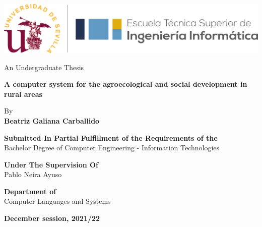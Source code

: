 \begin{center}

\vspace*{1cm}

\includegraphics[width=\textwidth]{fig/etsii_us.png}

\vspace*{3cm}
\begin{large}
An Undergraduate Thesis
\end{large}

\vspace*{0.1in}
\textbf{\huge A computer system for the agroecological and social development in rural areas} %

\vspace*{.2in}

{\large By}\\
\textbf{\Large Beatriz Galiana Carballido} %

\vspace*{3cm}

\textbf{Submitted In Partial Fulfillment of the Requirements of the}\\
{\large Bachelor Degree of Computer Engineering - Information Technologies} %

\vspace*{0.2in}

\textbf{Under The Supervision Of}\\
{\large Pablo Neira Ayuso}\\ %

\vspace*{0.2in}

\textbf{Department of}\\
{\large Computer Languages and Systems}

\vspace*{.6in}
\textbf{\Large December session, 2021/22} %

\end{center}


\thispagestyle{empty} %
\clearpage\setcounter{page}{1} %
